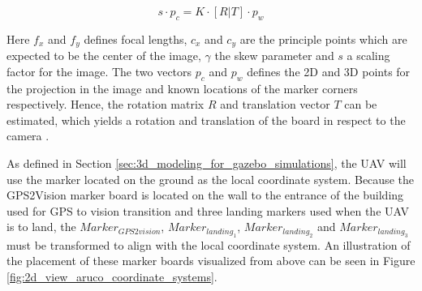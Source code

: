 \documentclass[../Head/report.tex]{subfiles}
\begin{document}
\begin{equation}
	s \cdot p_{c} = K \cdot[R|T] \cdot p_{w}
	\label{eq:pnp_simplified}
\end{equation}

Here $f_x$ and $f_y$ defines focal lengths, $c_x$ and $c_y$ are the principle points which are expected to be the center of the image, $\gamma$ the skew parameter and $s$ a scaling factor for the image. The two vectors $p_c$ and $p_w$ defines the 2D and 3D points for the projection in the image and known locations of the marker corners respectively. Hence, the rotation matrix $R$ and translation vector $T$ can be estimated, which yields a rotation and translation of the board in respect to the camera \cite{pnp} \cite{estimatePoseBoard}. 

As defined in Section \ref{sec:3d_modeling_for_gazebo_simulations}, the UAV will use the marker located on the ground as the local coordinate system. Because the GPS2Vision marker board is located on the wall to the entrance of the building used for GPS to vision transition and three landing markers used when the UAV is to land, the $Marker_{GPS2vision}$, $Marker_{landing_1}$, $Marker_{landing_2}$ and $Marker_{landing_3}$ must be transformed to align with the local coordinate system. An illustration of the placement of these marker boards visualized from above can be seen in Figure \ref{fig:2d_view_aruco_coordinate_systems}. 
\end{document}

